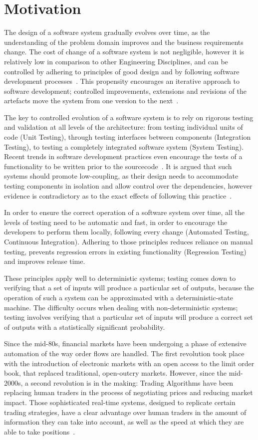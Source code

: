 \section{Motivation}
The design of a software system gradually evolves over time, as the understanding of the problem domain improves and the business requirements change. The cost of change of a software system is not negligible, however it is relatively low in comparison to other Engineering Disciplines, and can be controlled by adhering to principles of good design and by following software development processes~\cite{Gof1995}. This propensity encourages an iterative approach to software development; controlled improvements, extensions and revisions of the artefacts move the system from one version to the next~\cite{AgileManifesto}. 

The key to controlled evolution of a software system is to rely on rigorous testing and validation at all levels of the architecture: from testing individual units of code (Unit Testing), through testing interfaces between components (Integration Testing), to testing a completely integrated software system (System Testing). Recent trends in software development practices even encourage the tests of a functionality to be written prior to the sourcecode~\cite{Beck2001}. It is argued that such systems should promote low-coupling, as their design needs to accommodate testing components in isolation and allow control over the dependencies, however evidence is contradictory as to the exact effects of following this practice~\cite{Siniaalto2007}.

In order to ensure the correct operation of a software system over time, all the levels of testing need to be automatic and fast, in order to encourage the developers to perform them locally, following every change (Automated Testing, Continuous Integration). Adhering to those principles reduces reliance on manual testing, prevents regression errors in existing functionality (Regression Testing) and improves release time.

These principles apply well to deterministic systems; testing comes down to verifying that a set of inputs will produce a particular set of outputs, because the operation of such a system can be approximated with a deterministic-state machine. The difficulty occurs when dealing with non-deterministic systems; testing involves verifying that a particular set of inputs will produce a correct set of outputs with a statistically significant probability.

Since the mid-80s, financial markets have been undergoing a phase of extensive automation of the way order flows are handled. The first revolution took place with the introduction of electronic markets with an open access to the limit order book, that replaced traditional, open-outcry markets. However, since the mid-2000s, a second revolution is in the making: Trading Algorithms have been replacing human traders in the process of negotiating prices and reducing market impact. Those sophisticated real-time systems, designed to replicate certain trading strategies, have a clear advantage over human traders in the amount of information they can take into account, as well as the speed at which they are able to take positions~\cite{Lenglet}.

